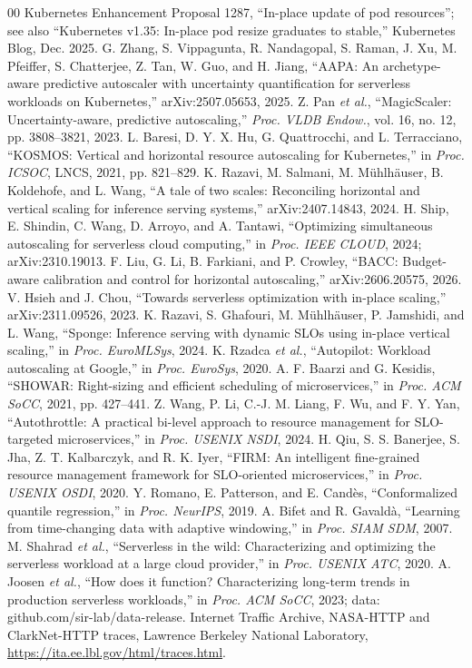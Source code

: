 \documentclass[conference]{IEEEtran}
\begin{document}
\begin{thebibliography}{00}
 Kubernetes Enhancement Proposal 1287, ``In-place update of pod resources''; see also ``Kubernetes v1.35: In-place pod resize graduates to stable,'' Kubernetes Blog, Dec. 2025.
 G. Zhang, S. Vippagunta, R. Nandagopal, S. Raman, J. Xu, M. Pfeiffer, S. Chatterjee, Z. Tan, W. Guo, and H. Jiang, ``AAPA: An archetype-aware predictive autoscaler with uncertainty quantification for serverless workloads on Kubernetes,'' arXiv:2507.05653, 2025.
 Z. Pan \emph{et al.}, ``MagicScaler: Uncertainty-aware, predictive autoscaling,'' \emph{Proc. VLDB Endow.}, vol. 16, no. 12, pp. 3808--3821, 2023.
 L. Baresi, D. Y. X. Hu, G. Quattrocchi, and L. Terracciano, ``KOSMOS: Vertical and horizontal resource autoscaling for Kubernetes,'' in \emph{Proc. ICSOC}, LNCS, 2021, pp. 821--829.
 K. Razavi, M. Salmani, M. M\"uhlh\"auser, B. Koldehofe, and L. Wang, ``A tale of two scales: Reconciling horizontal and vertical scaling for inference serving systems,'' arXiv:2407.14843, 2024.
 H. Ship, E. Shindin, C. Wang, D. Arroyo, and A. Tantawi, ``Optimizing simultaneous autoscaling for serverless cloud computing,'' in \emph{Proc. IEEE CLOUD}, 2024; arXiv:2310.19013.
 F. Liu, G. Li, B. Farkiani, and P. Crowley, ``BACC: Budget-aware calibration and control for horizontal autoscaling,'' arXiv:2606.20575, 2026.
 V. Hsieh and J. Chou, ``Towards serverless optimization with in-place scaling,'' arXiv:2311.09526, 2023.
 K. Razavi, S. Ghafouri, M. M\"uhlh\"auser, P. Jamshidi, and L. Wang, ``Sponge: Inference serving with dynamic SLOs using in-place vertical scaling,'' in \emph{Proc. EuroMLSys}, 2024.
 K. Rzadca \emph{et al.}, ``Autopilot: Workload autoscaling at Google,'' in \emph{Proc. EuroSys}, 2020.
 A. F. Baarzi and G. Kesidis, ``SHOWAR: Right-sizing and efficient scheduling of microservices,'' in \emph{Proc. ACM SoCC}, 2021, pp. 427--441.
 Z. Wang, P. Li, C.-J. M. Liang, F. Wu, and F. Y. Yan, ``Autothrottle: A practical bi-level approach to resource management for SLO-targeted microservices,'' in \emph{Proc. USENIX NSDI}, 2024.
 H. Qiu, S. S. Banerjee, S. Jha, Z. T. Kalbarczyk, and R. K. Iyer, ``FIRM: An intelligent fine-grained resource management framework for SLO-oriented microservices,'' in \emph{Proc. USENIX OSDI}, 2020.
 Y. Romano, E. Patterson, and E. Cand\`es, ``Conformalized quantile regression,'' in \emph{Proc. NeurIPS}, 2019.
 A. Bifet and R. Gavald\`a, ``Learning from time-changing data with adaptive windowing,'' in \emph{Proc. SIAM SDM}, 2007.
 M. Shahrad \emph{et al.}, ``Serverless in the wild: Characterizing and optimizing the serverless workload at a large cloud provider,'' in \emph{Proc. USENIX ATC}, 2020.
 A. Joosen \emph{et al.}, ``How does it function? Characterizing long-term trends in production serverless workloads,'' in \emph{Proc. ACM SoCC}, 2023; data: github.com/sir-lab/data-release.
 Internet Traffic Archive, NASA-HTTP and ClarkNet-HTTP traces, Lawrence Berkeley National Laboratory, \url{https://ita.ee.lbl.gov/html/traces.html}.
\end{thebibliography}
\end{document}
